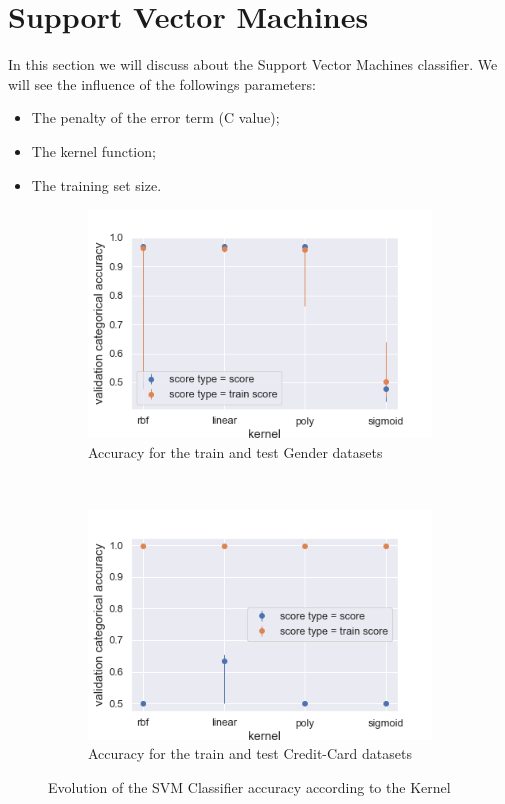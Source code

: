 \documentclass[10pt]{article}
\begin{document}
	\section{Support Vector Machines}
		In this section we will discuss about the Support Vector Machines classifier. We will see the influence of the followings parameters:
		\begin{itemize}
			\item The penalty of the error term (C value);
			\item The kernel function;
			\item The training set size.
		\end{itemize}

		\begin{figure}
			\centering
			\begin{subfigure}[]{0.45\columnwidth}
				\centering
				\includegraphics[width=\linewidth]{../graphics/svm_gender_kernel_score_type_score_type.png}
				\caption{Accuracy for the train and test Gender datasets}
				\label{svm:g_train_vs_test}
			\end{subfigure}
			~
			\begin{subfigure}[]{0.45\columnwidth}
				\centering
				\includegraphics[width=\linewidth]{../graphics/svm_creditcard_kernel_score_type_score_type.png}
				\caption{Accuracy for the train and test Credit-Card datasets}
				\label{svm:cc_train_vs_test}
			\end{subfigure}
			\caption{Evolution of the SVM Classifier accuracy according to the Kernel}
			\label{svm:train_vs_test}
		\end{figure}
\end{document}

